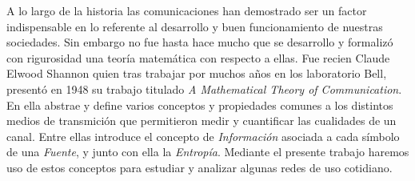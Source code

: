 A lo largo de la historia las comunicaciones han demostrado ser un factor indispensable en lo referente al desarrollo y buen funcionamiento de nuestras sociedades. Sin embargo no fue hasta hace mucho que se desarrollo y formalizó con rigurosidad una teoría matemática con respecto a ellas. Fue recien Claude Elwood Shannon quien tras trabajar por muchos años en los laboratorio Bell, presentó en 1948 su trabajo titulado \textit{A Mathematical Theory of Communication}. En ella abstrae y define varios conceptos y propiedades comunes a los distintos medios de transmición que permitieron medir y cuantificar las cualidades de un canal. Entre ellas introduce el concepto de \textit{Información} asociada a cada símbolo de una \textit{Fuente}, y junto con ella la \textit{Entropía}. Mediante el presente trabajo haremos uso de estos conceptos para estudiar y analizar algunas redes de uso cotidiano.







